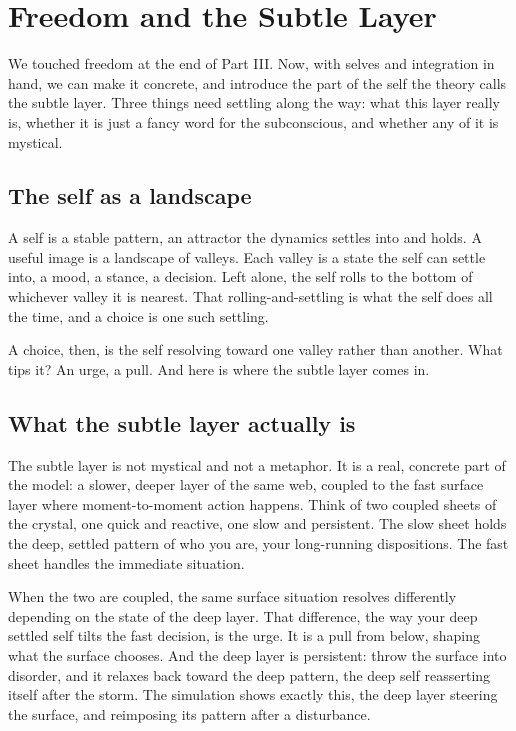 \section{Freedom and the Subtle Layer}

We touched freedom at the end of Part III. Now, with selves and integration in hand, we can make it concrete, and introduce the part of the self the theory calls the subtle layer. Three things need settling along the way: what this layer really is, whether it is just a fancy word for the subconscious, and whether any of it is mystical.

\subsection{The self as a landscape}

A self is a stable pattern, an attractor the dynamics settles into and holds. A useful image is a landscape of valleys. Each valley is a state the self can settle into, a mood, a stance, a decision. Left alone, the self rolls to the bottom of whichever valley it is nearest. That rolling-and-settling is what the self does all the time, and a choice is one such settling.

A choice, then, is the self resolving toward one valley rather than another. What tips it? An urge, a pull. And here is where the subtle layer comes in.

\subsection{What the subtle layer actually is}

The subtle layer is not mystical and not a metaphor. It is a real, concrete part of the model: a slower, deeper layer of the same web, coupled to the fast surface layer where moment-to-moment action happens. Think of two coupled sheets of the crystal, one quick and reactive, one slow and persistent. The slow sheet holds the deep, settled pattern of who you are, your long-running dispositions. The fast sheet handles the immediate situation.

When the two are coupled, the same surface situation resolves differently depending on the state of the deep layer. That difference, the way your deep settled self tilts the fast decision, is the urge. It is a pull from below, shaping what the surface chooses. And the deep layer is persistent: throw the surface into disorder, and it relaxes back toward the deep pattern, the deep self reasserting itself after the storm. The simulation shows exactly this, the deep layer steering the surface, and reimposing its pattern after a disturbance.

